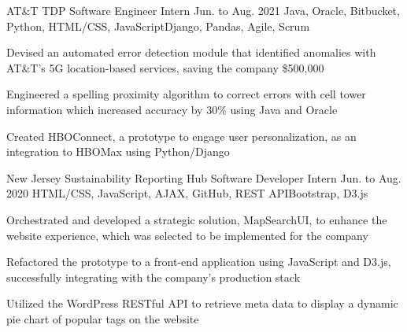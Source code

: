 
\begin{cventry}
    {AT\&T}
    {TDP Software Engineer Intern}
    {Jun. to Aug. 2021}
    {Java, Oracle, Bitbucket, Python, HTML/CSS, JavaScript}{Django, Pandas, Agile, Scrum}
    \begin{cvitems}
        \item Devised an automated error detection module that identified anomalies with AT\&T's 5G location-based services, saving the company \$500,000
        \item Engineered a spelling proximity algorithm to correct errors with cell tower information which increased accuracy by 30\% using Java and Oracle
        \item Created HBOConnect, a prototype to engage user personalization, as an integration to HBOMax using Python/Django
    \end{cvitems}
\end{cventry}




\begin{cventry}
    {New Jersey Sustainability Reporting Hub}
    {Software Developer Intern}
    {Jun. to Aug. 2020}
    {HTML/CSS, JavaScript, AJAX, GitHub, REST API}{Bootstrap, D3.js}
    \begin{cvitems}
        \item Orchestrated and developed a strategic solution, MapSearchUI, to enhance the website experience, which was selected to be implemented for the company
        \item Refactored the prototype to a front-end application using JavaScript and D3.js, successfully integrating with the company's production stack
        \item Utilized the WordPress RESTful API to retrieve meta data  to display a dynamic pie chart of popular tags on the website
    \end{cvitems}
\end{cventry}


